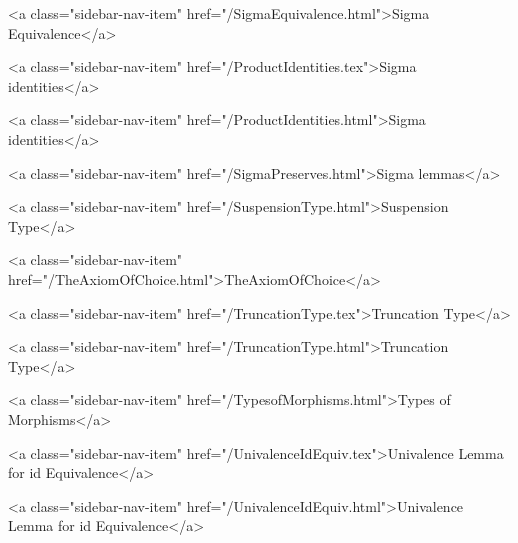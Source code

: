       
    
      
        
          <a class="sidebar-nav-item" href="/SigmaEquivalence.html">Sigma Equivalence</a>
        
      
    
      
        
          <a class="sidebar-nav-item" href="/ProductIdentities.tex">Sigma identities</a>
        
      
    
      
        
          <a class="sidebar-nav-item" href="/ProductIdentities.html">Sigma identities</a>
        
      
    
      
        
          <a class="sidebar-nav-item" href="/SigmaPreserves.html">Sigma lemmas</a>
        
      
    
      
        
          <a class="sidebar-nav-item" href="/SuspensionType.html">Suspension Type</a>
        
      
    
      
        
          <a class="sidebar-nav-item" href="/TheAxiomOfChoice.html">TheAxiomOfChoice</a>
        
      
    
      
        
          <a class="sidebar-nav-item" href="/TruncationType.tex">Truncation Type</a>
        
      
    
      
        
          <a class="sidebar-nav-item" href="/TruncationType.html">Truncation Type</a>
        
      
    
      
        
          <a class="sidebar-nav-item" href="/TypesofMorphisms.html">Types of Morphisms</a>
        
      
    
      
        
          <a class="sidebar-nav-item" href="/UnivalenceIdEquiv.tex">Univalence Lemma for id Equivalence</a>
        
      
    
      
        
          <a class="sidebar-nav-item" href="/UnivalenceIdEquiv.html">Univalence Lemma for id Equivalence</a>
        
